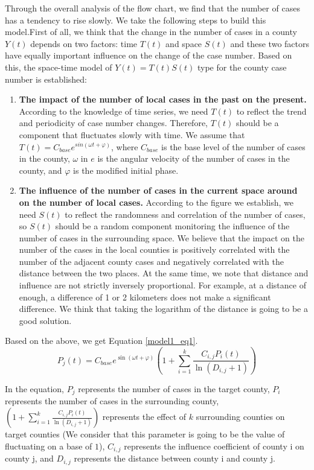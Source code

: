 \documentclass{mcmthesis}
\begin{document}
Through the overall analysis of the flow chart, we find that the number of cases has a tendency to rise slowly. We take the following steps to build this model\cite{4}.First of all, we think that the change in the number of cases in a county $Y(t)$ depends on two factors: time $T(t)$ and space $S(t)$ and these two factors have equally important influence on the change of the case number. Based on this, the space-time model of $Y(t) = T(t)S(t)$ type for the county case number is established:
\begin{enumerate}
	\item \textbf{The impact of the number of local cases in the past on the present.} According to the knowledge of time series, we need $T(t)$ to reflect the trend and periodicity of case number changes. Therefore, $T(t)$ should be a component that fluctuates slowly with time. We assume that $ T(t) = C_{base}e^{sin(\omega t+\varphi)}$, where $C_{base}$ is the base level of the number of cases in the county, $\omega$ in $e$ is the angular velocity of the number of cases in the county, and $\varphi$ is the modified initial phase.
	\item \textbf{The influence of the number of cases in the current space around on the number of local cases.} According to the figure we establish, we need $S(t)$ to reflect the randomness and correlation of the number of cases, so $S(t)$ should be a random component monitoring the influence of the number of cases in the surrounding space. We believe that the impact on the number of the cases in the local counties is positively correlated with the number of the adjacent county cases and negatively correlated with the distance between the two places. At the same time, we note that distance and influence are not strictly inversely proportional. For example, at a distance of enough, a difference of 1 or 2 kilometers does not make a significant difference. We think that taking the logarithm of the distance is going to be a good solution.
\end{enumerate} 

Based on the above, we get Equation \eqref{model1_eq1}.
\begin{equation}
P_{j}(t) = C_{base} e^{\sin (\omega t+\varphi)} (1+\sum_{i=1}^{k} {\frac{C_{i,j} P_{i}(t)}{\ln (D_{i,j}+1)}})
\label{model1_eq1}
\end{equation}

In the equation, $P_{j}$ represents the number of cases in the target county, $P_{i}$ represents the number of cases in the surrounding county, $(1+\sum_{i=1}^{k} {\frac{C_{i,j} P_{i}(t)}{\ln (D_{i,j}+1)}})$ represents the effect of $k$ surrounding counties on target counties (We consider that this parameter is going to be the value of fluctuating on a base of $1$), $C_{i,j}$ represents the influence coefficient of county i on county j, and $D_{i,j}$ represents the distance between county i and county j.
\end{document}
